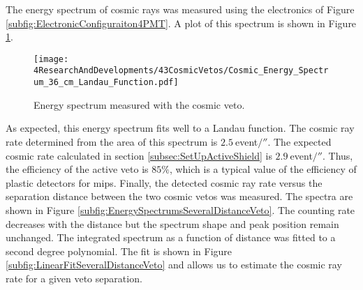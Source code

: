 The energy spectrum of cosmic rays was measured using the electronics of Figure \ref{subfig:ElectronicConfiguraiton4PMT}. A plot of this spectrum is shown in Figure \ref{fig:EnergySpectrumCosmicVeto}. 
\begin{figure}[h]
\centering
\texttt{[image: 4ResearchAndDevelopments/43CosmicVetos/Cosmic\_Energy\_Spectrum\_36\_cm\_Landau\_Function.pdf]}
\caption{Energy spectrum measured with the cosmic veto.\label{fig:EnergySpectrumCosmicVeto}}
\end{figure}
As expected, this energy spectrum fits well to a Landau function. The cosmic ray rate determined from the area of this spectrum is $2.5~$event$/\second$. The expected cosmic rate calculated in section \ref{subsec:SetUpActiveShield} is $2.9~$event$/\second$. Thus, the efficiency of the active veto is $85\%$, which is a typical value of the efficiency of plastic detectors for mips. Finally, the detected cosmic ray rate versus the separation distance between the two cosmic vetos was measured. The spectra are shown in Figure \ref{subfig:EnergySpectrumsSeveralDistanceVeto}. The counting rate decreases with the distance but the spectrum shape and peak position remain unchanged. The integrated spectrum as a function of distance was fitted to a second degree polynomial. The fit is shown in Figure \ref{subfig:LinearFitSeveralDistanceVeto} and allows us to estimate the cosmic ray rate for a given veto separation.





